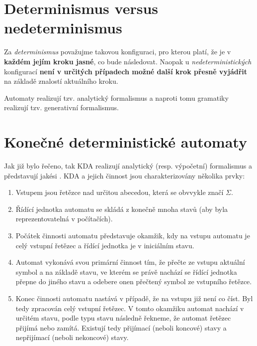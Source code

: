 \documentclass[10pt, a4paper, titlepage]{article}
\theoremstyle{note}
\begin{document}
\section{Determinismus versus nedeterminismus}
Za \emph{determinismus} považujme takovou konfiguraci, pro kterou platí, že je v \textbf{každém jejím kroku jasné}, co bude následovat.
Naopak u \emph{nedeterministických} konfigurací \textbf{není v určitých případech možné další krok přesně vyjádřit} na základě znalostí aktuálního kroku.

Automaty realizují tzv. analytický formalismus a naproti tomu gramatiky realizují tzv. generativní formalismus.

\section{Konečné deterministické automaty}

Jak již bylo řečeno, tak KDA realizují analytický (resp. výpočetní) formalismus a představují jakési .
KDA a jejich činnost jsou charakterizovány několika prvky:
\begin{enumerate}
\item
Vstupem jsou řetězce nad určitou abecedou, která se obvvykle značí $\Sigma$.

\item
Řídící jednotka automatu se skládá z konečně mnoha stavů (aby byla reprezentovatelná v počítačích).

\item
Počátek činnosti automatu představuje okamžik, kdy na vstupu automatu je celý vstupní řetězec a
řídící jednotka je v iniciálním stavu.

\item
Automat vykonává svou primární činnost tím, že přečte ze vstupu aktuální symbol a na základě stavu, ve kterém se právě
nachází se řídící jednotka přepne do jiného stavu a odebere onen přečtený symbol ze vstupního řetězce.

\item
Konec činnosti automatu nastává v případě, že na vstupu již není co číst. Byl tedy zpracován celý
vstupní řetězec. V tomto okamžiku automat nachází v určitém stavu, podle typu stavu následně řekneme, že
automat řetězec přijímá nebo zamítá. Existují tedy přijímací (neboli koncové) stavy a nepřijímací (neboli nekoncové) stavy.
\end{enumerate}
\end{document}
